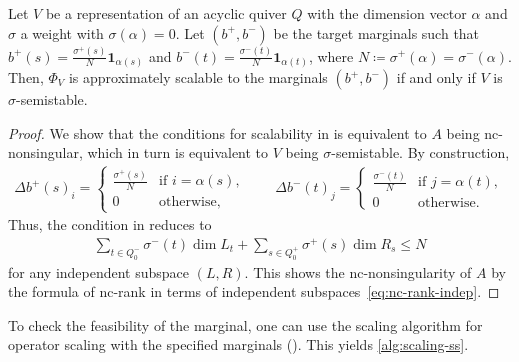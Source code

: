 \documentclass[a4paper,11pt]{article}
\numberwithin{equation}{section}
\newcommand{\ones}{\mathbf{1}}
\begin{document}
\begin{lemma}
    Let $V$ be a representation of an acyclic quiver $Q$ with the dimension vector $\alpha$ and $\sigma$ a weight with $\sigma(\alpha) = 0$.
    Let $(b^+, b^-)$ be the target marginals such that $b^+(s) = \frac{\sigma^+(s)}{N}\ones_{\alpha(s)}$ and $b^-(t) = \frac{\sigma^-(t)}{N}\ones_{\alpha(t)}$, where $N \coloneqq \sigma^+(\alpha) = \sigma^-(\alpha)$.
    Then, $\Phi_V$ is approximately scalable to the marginals $(b^+, b^-)$ if and only if $V$ is $\sigma$-semistable.
\end{lemma}
\begin{proof}
    We show that the conditions for scalability in  is equivalent to $A$ being nc-nonsingular, which in turn is equivalent to $V$ being $\sigma$-semistable.
    By construction, 
    \begin{align}
        \Delta b^+(s)_i = 
        \begin{cases}
            \frac{\sigma^+(s)}{N} & \text{if $i = \alpha(s)$}, \\
            0 & \text{otherwise},
        \end{cases}
        \qquad
        \Delta b^-(t)_j = 
        \begin{cases}
            \frac{\sigma^-(t)}{N} & \text{if $j = \alpha(t)$}, \\
            0 & \text{otherwise}.
        \end{cases}
    \end{align}
    Thus, the condition in  reduces to
    \begin{align}\label{eq:ss-indep}
        \sum_{t \in Q_0^-} \sigma^-(t) \dim L_t + \sum_{s \in Q_0^+} \sigma^+(s) \dim R_s \leq N
    \end{align}
    for any independent subspace $(L, R)$.
    This shows the nc-nonsingularity of $A$ by the formula of nc-rank in terms of independent subspaces~\eqref{eq:nc-rank-indep}.
\end{proof}

To check the feasibility of the marginal, one can use the scaling algorithm for operator scaling with the specified marginals ().
This yields \cref{alg:scaling-ss}.
\end{document}

